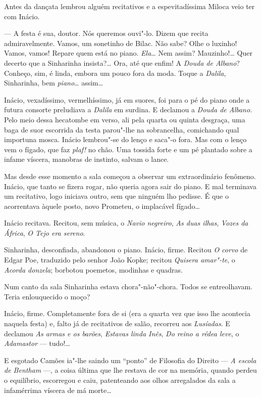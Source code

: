 Antes da dançata lembrou alguém recitativos e a espevitadíssima Miloca
veio ter com Inácio.

--- A festa é sua, doutor. Nós queremos ouvi"-lo. Dizem que recita
admiravelmente. Vamos, um sonetinho de Bilac. Não sabe? Olhe o luxinho!
Vamos, vamos! Repare quem está no piano. \emph{Ela}\ldots{} Nem assim?
Mauzinho!\ldots{} Quer decerto que a Sinharinha insista?\ldots{} Ora, até que
enfim! A \emph{Douda de Albano}? Conheço, sim, é linda, embora um pouco
fora da moda. Toque a \emph{Dalila}, Sinharinha, bem \emph{piano}\ldots{}
assim\ldots{}

Inácio, vexadíssimo, vermelhíssimo, já em suores, foi para o pé do piano
onde a futura consorte preludiava a \emph{Dalila} em surdina. E declamou
a \emph{Douda de Albano}. Pelo meio dessa hecatombe em verso, ali pela
quarta ou quinta desgraça, uma baga de suor escorrida da testa parou"-lhe
na sobrancelha, comichando qual importuna mosca. Inácio lembrou"-se do
lenço e saca"-o fora. Mas com o lenço vem o fígado, que faz \emph{plaf!}
no chão. Uma tossida forte e um pé plantado sobre a infame víscera,
manobras de instinto, salvam o lance.

Mas desde esse momento a sala começou a observar um extraordinário
fenômeno. Inácio, que tanto se fizera rogar, não queria agora sair do
piano. E mal terminava um recitativo, logo iniciava outro, sem que
ninguém lho pedisse. É que o acorrentava àquele posto, novo Prometeu, o
implacável fígado\ldots{}

Inácio recitava. Recitou, sem música, o \emph{Navio negreiro}, \emph{As
duas ilhas}, \emph{Vozes da África}, \emph{O Tejo era sereno}.

Sinharinha, desconfiada, abandonou o piano. Inácio, firme. Recitou
\emph{O corvo} de Edgar Poe, traduzido pelo senhor João Kopke; recitou
\emph{Quisera amar"-te}, o \emph{Acorda donzela}; borbotou poemetos,
modinhas e quadras.

Num canto da sala Sinharinha estava chora"-não"-chora. Todos se
entreolhavam. Teria enlouquecido o moço?

Inácio, firme. Completamente fora de si (era a quarta vez que isso lhe
acontecia naquela festa) e, falto já de recitativos de salão, recorreu
aos \emph{Lusíadas}. E declamou \emph{As armas e os barões},
\emph{Estavas linda Inês}, \emph{Do reino a rédea leve}, o
\emph{Adamastor} --- tudo!\ldots{}

E esgotado Camões ia"-lhe saindo um ``ponto'' de Filosofia do Direito ---
\emph{A escola de Bentham} ---, a coisa última que lhe restava de cor na
memória, quando perdeu o equilíbrio, escorregou e caiu, patenteando aos
olhos arregalados da sala a infamérrima víscera de má morte\ldots{}

